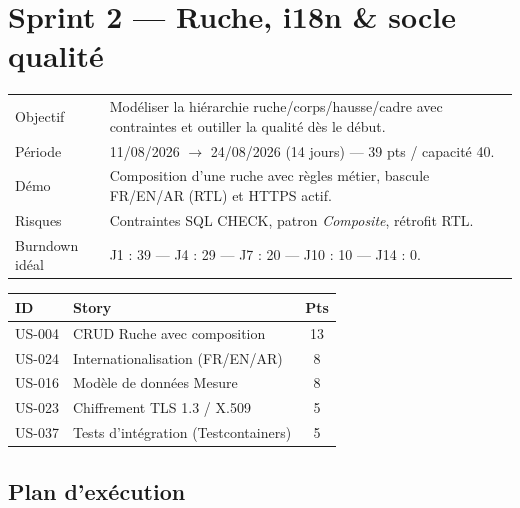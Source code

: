 \section{Sprint 2 --- Ruche, i18n \& socle qualité}

\begin{center}
\begin{tabular}{lp{11cm}}
\toprule
Objectif  & Modéliser la hiérarchie ruche/corps/hausse/cadre avec
            contraintes et outiller la qualité dès le début. \\
Période   & 11/08/2026 $\rightarrow$ 24/08/2026 (14 jours) --- 39 pts / capacité 40. \\
Démo      & Composition d'une ruche avec règles métier, bascule FR/EN/AR
            (RTL) et HTTPS actif. \\
Risques   & Contraintes SQL CHECK, patron \emph{Composite}, rétrofit RTL. \\
Burndown idéal & J1 : 39 --- J4 : 29 --- J7 : 20 --- J10 : 10 --- J14 : 0. \\
\bottomrule
\end{tabular}
\end{center}

\begin{center}
\begin{tabular}{lp{9cm}c}
\toprule
\textbf{ID} & \textbf{Story} & \textbf{Pts} \\
\midrule
US-004 & CRUD Ruche avec composition            & 13 \\
US-024 & Internationalisation (FR/EN/AR)    & 8 \\
US-016 & Modèle de données Mesure               & 8 \\
US-023 & Chiffrement TLS 1.3 / X.509              & 5 \\
US-037 & Tests d'intégration (Testcontainers)       & 5 \\
\bottomrule
\end{tabular}
\end{center}

\subsection{Plan d'exécution}

